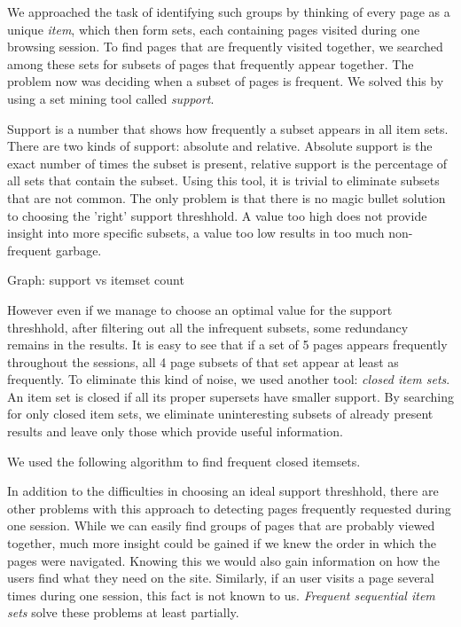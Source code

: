 \documentclass[english,a4paper]{article}
\begin{document}
We approached the task of identifying such groups by thinking of every page as a unique \emph{item}, which then form sets, each containing pages visited during one browsing session. To find pages that are frequently visited together, we searched among these sets for subsets of pages that frequently appear together. The problem now was deciding when a subset of pages is frequent. We solved this by using a set mining \cite{frequent_item_set_mining} tool called \emph{support}.

Support is a number that shows how frequently a subset appears in all item sets. There are two kinds of support: absolute and relative. Absolute support is the exact number of times the subset is present, relative support is the percentage of all sets that contain the subset. Using this tool, it is trivial to eliminate subsets that are not common. The only problem is that there is no magic bullet solution to choosing the 'right' support threshhold. A value too high does not provide insight into more specific subsets, a value too low results in too much non-frequent garbage.

Graph: support vs itemset count

However even if we manage to choose an optimal value for the support threshhold, after filtering out all the infrequent subsets, some redundancy remains in the results. It is easy to see that if a set of 5 pages appears frequently throughout the sessions, all 4 page subsets of that set appear at least as frequently. To eliminate this kind of noise, we used another tool: \emph{closed item sets}. An item set is closed if all its proper supersets have smaller support. By searching for only closed item sets, we eliminate uninteresting subsets of already present results and leave only those which provide useful information.

We used the following algorithm to find frequent closed itemsets.

In addition to the difficulties in choosing an ideal support threshhold, there are other problems with this approach to detecting pages frequently requested during one session. While we can easily find groups of pages that are probably viewed together, much more insight could be gained if we knew the order in which the pages were navigated. Knowing this we would also gain information on how the users find what they need on the site. Similarly, if an user visits a page several times during one session, this fact is not known to us. \emph{Frequent sequential item sets} solve these problems at least partially.
\end{document}
